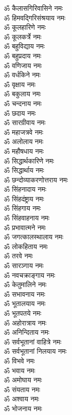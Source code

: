 \begin{multicols}{2}
\begin{flushleft}
ॐ कैलासगिरिवासिने नमः\\
ॐ हिमवद्गिरिसंश्रयाय नमः\hfill{}\\
ॐ कूलहारिणे नमः\\
ॐ कूलकर्त्रे नमः\\
ॐ बहुविद्याय नमः\\
ॐ बहुप्रदाय नमः\\
ॐ वणिजाय नमः\\
ॐ वर्धकिने नमः\\
ॐ वृक्षाय नमः\\
ॐ बकुलाय नमः\\
ॐ चन्दनाय नमः\\
ॐ छदाय नमः\hfill{}\\
ॐ सारग्रीवाय नमः\\
ॐ महाजत्रवे नमः\\
ॐ अलोलाय नमः\\
ॐ महौषधाय नमः\\
ॐ सिद्धार्थकारिणे नमः\\
ॐ सिद्धार्थाय नमः\\
ॐ छन्दोव्याकरणोत्तराय नमः\\
ॐ सिंहनादाय नमः\\
ॐ सिंहदंष्ट्राय नमः\\
ॐ सिंहगाय नमः\hfill{}\\
ॐ सिंहवाहनाय नमः\\
ॐ प्रभावात्मने नमः\\
ॐ जगत्कालस्थालाय नमः\\
ॐ लोकहिताय नमः\\
ॐ तरवे नमः\\
ॐ सारञ्गाय नमः\\
ॐ नवचक्राङ्गाय नमः\\
ॐ केतुमालिने नमः\\
ॐ सभावनाय नमः\\
ॐ भूतालयाय नमः\hfill{}\\
ॐ भूतपतये नमः\\
ॐ अहोरात्राय नमः\\
ॐ अनिन्दिताय नमः\\
ॐ सर्वभूतानां वाहित्रे नमः\\
ॐ सर्वभूतानां निलयाय नमः\\
ॐ विभवे नमः\\
ॐ भवाय नमः\\
ॐ अमोघाय नमः\\
ॐ संयताय नमः\\
ॐ अश्वाय नमः\hfill{}\\
ॐ भोजनाय नमः\\

\end{flushleft}
\end{multicols}
